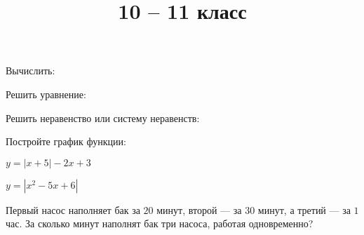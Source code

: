 \begin{listofex}
	\item Вычислить:
	\begin{enumcols}[itemcolumns=2]
		\item {}
		\item {}
		\item {}
		\item {}
		\item {}
	\end{enumcols}
	\item {}
	\item Решить уравнение:
	\begin{enumcols}[itemcolumns=2]
		\item {}
		\item {}
		\item {}
		\item {}
		\item {}
		\item {}
	\end{enumcols}
	\item Решить неравенство или систему неравенств:
	\begin{enumcols}[itemcolumns=2]
		\item {}
		\item {}
		\item {}
		\item {}
	\end{enumcols}
	\item {}
	\item {}
	\item Постройте график функции:
	\begin{enumcols}[itemcolumns=2]
		\item \( y=|x+5|-2x+3 \)
		\item \( y=|x^2-5x+6| \)
		\item {}
	\end{enumcols}
	\item {}
	\item Первый насос наполняет бак за \( 20 \) минут, второй --- за \( 30 \) минут, а третий --- за \( 1 \) час. За сколько минут наполнят бак три насоса, работая одновременно?
\end{listofex}
\title{10 -- 11 класс}
